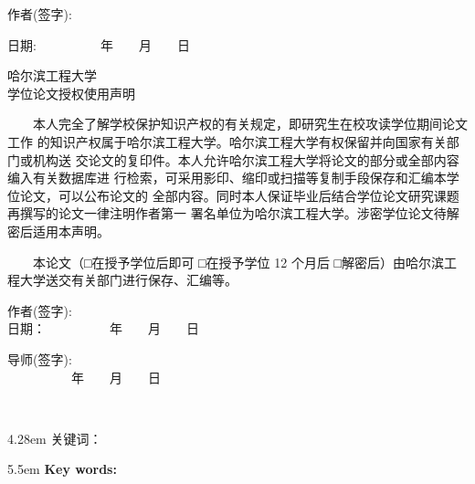 {\begin{titlepage}
    \hfill 作者(签字):~~~~~~~~~~~~~~~~~~~~~~~~~~~~~~~
    
    \hfill 日期:~~~~~~~~~~年~~~~月~~~~日
    
    \begin{center}
    	\heiti  \xiaosan 哈尔滨工程大学\\
    	学位论文授权使用声明
    \end{center}
    
    ~~~~本人完全了解学校保护知识产权的有关规定，即研究生在校攻读学位期间论文工作
    的知识产权属于哈尔滨工程大学。哈尔滨工程大学有权保留并向国家有关部门或机构送
    交论文的复印件。本人允许哈尔滨工程大学将论文的部分或全部内容编入有关数据库进
    行检索，可采用影印、缩印或扫描等复制手段保存和汇编本学位论文，可以公布论文的
    全部内容。同时本人保证毕业后结合学位论文研究课题再撰写的论文一律注明作者第一
    署名单位为哈尔滨工程大学。涉密学位论文待解密后适用本声明。
    
    ~~~~本论文（□在授予学位后即可 □在授予学位 12 个月后 □解密后）由哈尔滨工
    程大学送交有关部门进行保存、汇编等。
    
    \parbox[t][0.8cm][t]{7cm}{作者(签字):\\日期：~~~~~~~~~~年~~~~月~~~~日}
    \parbox[t][0.8cm][t]{7cm}{导师(签字):\\~~~~~~~~~~年~~~~月~~~~日}
    
\fi

    \end{titlepage}

  \ifoneortwoside
    \newpage
    ~~~\vspace{1em}
    \thispagestyle{empty}
  \fi
\clearpage {}
\setcounter{page}{1}
\song \normalsize
{}
\@cabstract
\vspace{1.6em}

\hangindent4.28em\noindent
{\hei 关键词：} \@ckeywords

\clearpage
 {}  %
\@eabstract
\vspace{1.6em}

\hangindent5.5em\noindent
{\textbf{Key words:}}  \@ekeywords
\wuhaobiao  %
}

